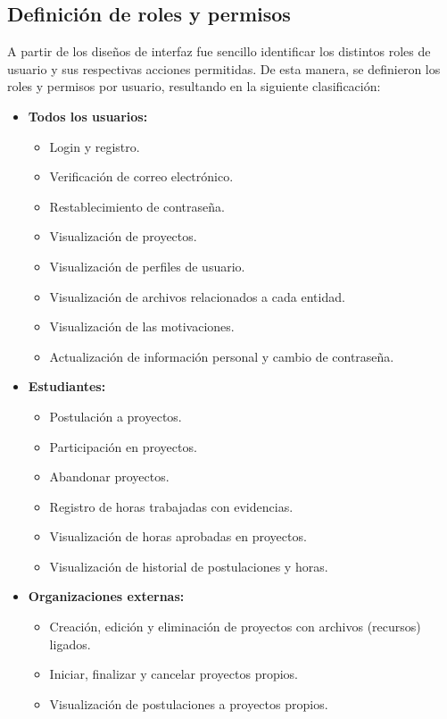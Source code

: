 \subsection{Definición de roles y permisos}
A partir de los diseños de interfaz fue sencillo identificar los distintos roles de usuario y sus respectivas acciones permitidas.
De esta manera, se definieron los roles y permisos por usuario, resultando en la siguiente clasificación:
\begin{itemize}
    \item \textbf{Todos los usuarios:}
    \begin{itemize}
        \item Login y registro.
        \item Verificación de correo electrónico.
        \item Restablecimiento de contraseña.
        \item Visualización de proyectos.
        \item Visualización de perfiles de usuario.
        \item Visualización de archivos relacionados a cada entidad.
        \item Visualización de las motivaciones.
        \item Actualización de información personal y cambio de contraseña.
    \end{itemize}
    \item \textbf{Estudiantes:}
    \begin{itemize}
        \item Postulación a proyectos.
        \item Participación en proyectos.
        \item Abandonar proyectos.
        \item Registro de horas trabajadas con evidencias.
        \item Visualización de horas aprobadas en proyectos.
        \item Visualización de historial de postulaciones y horas.
    \end{itemize}
    \item \textbf{Organizaciones externas:}
    \begin{itemize}
        \item Creación, edición y eliminación de proyectos con archivos (recursos) ligados.
        \item Iniciar, finalizar y cancelar proyectos propios.
        \item Visualización de postulaciones a proyectos propios.

\end{itemize}
\end{itemize}
